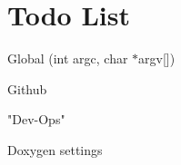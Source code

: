 \chapter{Todo List}
\hypertarget{todo}{}\label{todo}

\begin{DoxyRefList}
\item[Global \doxylink{main_8cpp_a0ddf1224851353fc92bfbff6f499fa97}{main} (int argc, char \texorpdfstring{$\ast$}{*}argv\mbox{[}\mbox{]})]\label{todo__todo000001}%
%

\begin{DoxyItemize}
\item Github
\item "{}\+Dev-\/\+Ops"{}
\item Doxygen settings
\end{DoxyItemize}
\end{DoxyRefList}